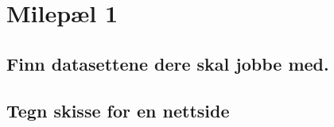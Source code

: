 \section{Milepæl 1}
\subsection{Finn datasettene dere skal jobbe med.}


\subsection{Tegn skisse for en nettside}
